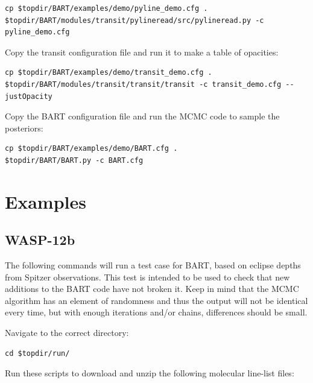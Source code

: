 \documentclass[letterpaper, 12pt]{article}
\begin{document}
{\fontsize{9.8}{1em}\selectfont
\begin{verbatim}
cp $topdir/BART/examples/demo/pyline_demo.cfg .  
$topdir/BART/modules/transit/pylineread/src/pylineread.py -c pyline_demo.cfg
\end{verbatim}}

\noindent Copy the transit configuration file and run it to make a
table of opacities:

{\fontsize{9.8}{1em}\selectfont
\begin{verbatim}
cp $topdir/BART/examples/demo/transit_demo.cfg .
$topdir/BART/modules/transit/transit/transit -c transit_demo.cfg --justOpacity
\end{verbatim}}

\noindent Copy the BART configuration file and run the MCMC code to sample the
posteriors:

{\fontsize{9.8}{1em}\selectfont
\begin{verbatim}
cp $topdir/BART/examples/demo/BART.cfg .
$topdir/BART/BART.py -c BART.cfg
\end{verbatim}}

\section{Examples}
\subsection{WASP-12b}
The following commands will run a test case for BART, based on eclipse
depths from Spitzer observations. This test is intended to be used to
check that new additions to the BART code have not broken it. Keep in
mind that the MCMC algorithm has an element of randomness and thus the
output will not be identical every time, but with enough iterations
and/or chains, differences should be small.
\newline

\noindent Navigate to the correct directory:
{\fontsize{9.8}{1em}\selectfont
\begin{verbatim}
cd $topdir/run/
\end{verbatim}}

\noindent Run these scripts to download and unzip the following
molecular line-list files:
\end{document}
